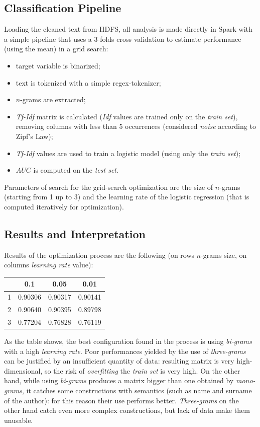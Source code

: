 \documentclass[fleqn,10pt]{SelfArx}
\begin{document}
\subsection{Classification Pipeline}
Loading the cleaned text from HDFS, all analysis is made directly in Spark with a simple pipeline that uses a 3-folds cross validation to estimate performance (using the mean) in a grid search:
\begin{itemize}[noitemsep]
\item target variable is binarized;
\item text is tokenized with a simple regex-tokenizer;
\item $n$-grams are extracted;
\item \textit{Tf-Idf} matrix is calculated (\textit{Idf} values are trained only on the \textit{train set}), removing columns with less than 5 occurrences (considered \textit{noise} according to Zipf's Law);
\item \textit{Tf-Idf} values are used to train a logistic model (using only the \textit{train set});
\item $AUC$ is computed on the \textit{test set}.
\end{itemize}
Parameters of search for the grid-search optimization are the size of $n$-grams (starting from 1 up to 3) and the learning rate of the logistic regression (that is computed iteratively for optimization).

\subsection{Results and Interpretation}
Results of the optimization process are the following (on rows $n$-grams size, on columns \textit{learning rate} value):
\begin{center}
  \begin{tabular}[center]{l|c c c}
      & 0.1 & 0.05 & 0.01 \\
    \hline
    1 & 0.90306 & 0.90317 & 0.90141 \\
    2 & 0.90640 & 0.90395 & 0.89798 \\
    3 & 0.77204 & 0.76828 & 0.76119
  \end{tabular}
\end{center}
As the table shows, the best configuration found in the process is using \textit{bi-grams} with a high \textit{learning rate}.
Poor performances yielded by the use of \textit{three-grams} can be justified by an insufficient quantity of data: resulting matrix is very high-dimensional, so the risk of \textit{overfitting} the \textit{train set} is very high.
On the other hand, while using \textit{bi-grams} produces a matrix bigger than one obtained by \textit{mono-grams}, it catches some constructions with semantics (such as name and surname of the author): for this reason their use performs better.
\textit{Three-grams} on the other hand catch even more complex constructions, but lack of data make them unusable.
\end{document}
